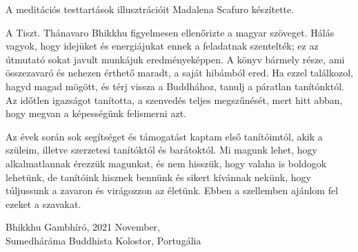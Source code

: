 A meditációs testtartások illusztrációit Madalena Scafuro készítette.

A Tiszt. Thánavaro Bhikkhu figyelmesen ellenőrizte a magyar szöveget.
Hálás vagyok, hogy idejüket és energiájukat ennek a feladatnak
szentelték; ez az útmutató sokat javult munkájuk eredményeképpen. A
könyv bármely része, ami összezavaró és nehezen érthető maradt, a saját
hibámból ered. Ha ezzel találkozol, hagyd magad mögött, és térj vissza a
Buddhához, tanulj a páratlan tanítónktól. Az időtlen igazságot
tanította, a szenvedés teljes megszűnését, mert hitt abban, hogy megvan
a képességünk felismerni azt.

Az évek során sok segítséget és támogatást kaptam első tanítóimtól, akik
a szüleim, illetve szerzetesi tanítóktól és barátoktól. Mi magunk lehet,
hogy alkalmatlannak érezzük magunkat, és nem hisszük, hogy valaha is
boldogok lehetünk, de tanítóink hisznek bennünk és sikert kívánnak
nekünk, hogy túljussunk a zavaron és virágozzon az életünk. Ebben a
szellemben ajánlom fel ezeket a szavakat.

\bigskip

\enlargethispage*{2\baselineskip}

{\raggedleft
Bhikkhu Gambhíró,
2021 November,\\
Sumedháráma Buddhista Kolostor, Portugália
\par}

